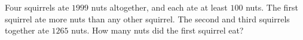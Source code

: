 Four squirrels ate $1999$ nuts altogether, and each ate at least $100$ nuts. The first squirrel ate more nuts than any other squirrel. The second and third squirrels together ate $1265$ nuts. How many nuts did the first squirrel eat?
